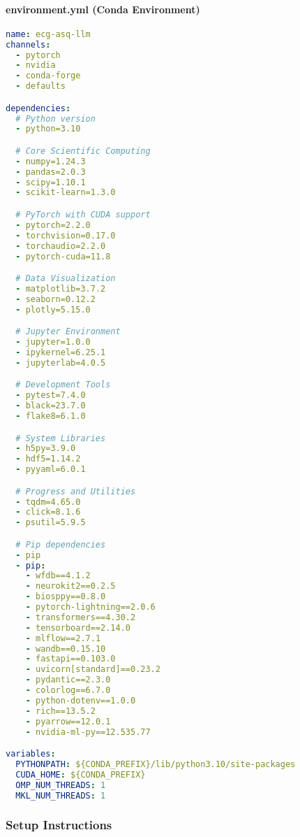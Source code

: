 \documentclass[11pt]{article}
\begin{document}
\paragraph{environment.yml (Conda Environment)}

\begin{lstlisting}[language=yaml, caption=environment.yml]
name: ecg-asq-llm
channels:
  - pytorch
  - nvidia
  - conda-forge
  - defaults

dependencies:
  # Python version
  - python=3.10

  # Core Scientific Computing
  - numpy=1.24.3
  - pandas=2.0.3
  - scipy=1.10.1
  - scikit-learn=1.3.0

  # PyTorch with CUDA support
  - pytorch=2.2.0
  - torchvision=0.17.0
  - torchaudio=2.2.0
  - pytorch-cuda=11.8

  # Data Visualization
  - matplotlib=3.7.2
  - seaborn=0.12.2
  - plotly=5.15.0

  # Jupyter Environment
  - jupyter=1.0.0
  - ipykernel=6.25.1
  - jupyterlab=4.0.5

  # Development Tools
  - pytest=7.4.0
  - black=23.7.0
  - flake8=6.1.0

  # System Libraries
  - h5py=3.9.0
  - hdf5=1.14.2
  - pyyaml=6.0.1

  # Progress and Utilities
  - tqdm=4.65.0
  - click=8.1.6
  - psutil=5.9.5

  # Pip dependencies
  - pip
  - pip:
    - wfdb==4.1.2
    - neurokit2==0.2.5
    - biosppy==0.8.0
    - pytorch-lightning==2.0.6
    - transformers==4.30.2
    - tensorboard==2.14.0
    - mlflow==2.7.1
    - wandb==0.15.10
    - fastapi==0.103.0
    - uvicorn[standard]==0.23.2
    - pydantic==2.3.0
    - colorlog==6.7.0
    - python-dotenv==1.0.0
    - rich==13.5.2
    - pyarrow==12.0.1
    - nvidia-ml-py==12.535.77

variables:
  PYTHONPATH: ${CONDA_PREFIX}/lib/python3.10/site-packages
  CUDA_HOME: ${CONDA_PREFIX}
  OMP_NUM_THREADS: 1
  MKL_NUM_THREADS: 1
\end{lstlisting}

\subsubsection{Setup Instructions}
\end{document}
